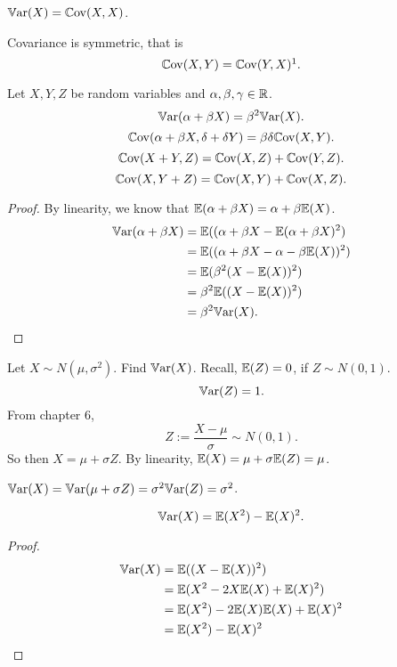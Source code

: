 \documentclass[10pt, a4paper]{article}
\begin{document}
\begin{property}
    $\mathbb{V}\mathrm{ar}(X) = \mathbb{C}\mathrm{ov}(X, X)$.
\end{property}

\begin{property}
    Covariance is symmetric,
    that is
    \[
    \Cov(X, Y) = \Cov(Y, X)\footnotemark.
    \]
\end{property}

\begin{corollary}
    Let $X, Y, Z$ be random variables and $\alpha, \beta, \gamma \in \mathbb{R}$.
    \[
    \mathbb{V}\mathrm{ar}(\alpha + \beta X) = \beta ^ 2\mathbb{V}\mathrm{ar}(X).
    \]
    \[
    \mathbb{C}\mathrm{ov}(\alpha + \beta X, \delta + \delta Y) = \beta\delta\mathbb{C}\mathrm{ov}(X, Y).
    \]
    \[
    \mathbb{C}\mathrm{ov}(X + Y, Z) = \mathbb{C}\mathrm{ov}(X, Z) + \mathbb{C}\mathrm{ov}(Y, Z).
    \]
    \[
    \mathbb{C}\mathrm{ov}(X, Y + Z) = \mathbb{C}\mathrm{ov}(X, Y) + \mathbb{C}\mathrm{ov}(X, Z).
    \]
    \begin{proof}
        By linearity,
        we know that $\mathbb{E}(\alpha + \beta X) = \alpha + \beta\mathbb{E}(X)$.
        \begin{align*}
            \mathbb{V}\mathrm{ar}(\alpha + \beta X) &= \mathbb{E}((\alpha + \beta X - \mathbb{E}(\alpha + \beta X) ^ 2) \\
            &= \mathbb{E}((\alpha + \beta X - \alpha - \beta\mathbb{E}(X)) ^ 2) \\
            &= \mathbb{E}(\beta ^ 2(X - \mathbb{E}(X)) ^ 2) \\
            &= \beta ^ 2\mathbb{E}((X - \mathbb{E}(X)) ^ 2) \\
            &= \beta ^ 2\mathbb{V}\mathrm{ar}(X).
        \end{align*}
    \end{proof}
\end{corollary}

\begin{example}
    Let $X \sim N(\mu, \sigma ^ 2)$.
    Find $\mathbb{V}\mathrm{ar}(X)$.
    Recall,
    $\mathbb{E}(Z) = 0$,
    if $Z \sim N(0, 1)$.
    \[
    \mathbb{V}\mathrm{ar}(Z) = 1.
    \]
    From chapter $6$,
    \[
    Z := \frac{X - \mu}{\sigma} \sim N(0, 1).
    \]
    So then $X = \mu + \sigma Z$.
    By linearity,
    $\mathbb{E}(X) = \mu + \sigma\mathbb{E}(Z) = \mu$.

    $\mathbb{V}\mathrm{ar}(X) = \mathbb{V}\mathrm{ar}(\mu + \sigma Z) = \sigma ^ 2 \mathbb{V}\mathrm{ar}(Z) = \sigma ^ 2$.
\end{example}

\begin{corollary}
    \[
    \mathbb{V}\mathrm{ar}(X) = \mathbb{E}(X ^ 2) - \mathbb{E}(X) ^ 2.
    \]
    \begin{proof}
        \begin{align*}
            \mathbb{V}\mathrm{ar}(X) &= \mathbb{E}((X - \mathbb{E}(X)) ^ 2) \\
            &= \mathbb{E}(X ^ 2 - 2X\mathbb{E}(X) + \mathbb{E}(X) ^ 2) \\
            &= \mathbb{E}(X ^ 2) - 2\mathbb{E}(X)\mathbb{E}(X) + \mathbb{E}(X) ^ 2 \\
            &= \mathbb{E}(X ^ 2) - \mathbb{E}(X) ^ 2
        \end{align*}
    \end{proof}
\end{corollary}
\end{document}
